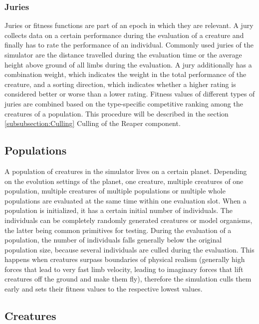 \documentclass[main]{subfiles}
\begin{document}
\subsubsection{Juries}

Juries or fitness functions are part of an epoch in which they are relevant. A jury collects data on a certain performance during the evaluation of a creature and finally has to rate the performance of an individual. Commonly used juries of the simulator are the distance travelled during the evaluation time or the average height above ground of all limbs during the evaluation. A jury additionally has a combination weight, which indicates the weight in the total performance of the creature, and a sorting direction, which indicates whether a higher rating is considered better or worse than a lower rating. Fitness values of different types of juries are combined based on the type-specific competitive ranking among the creatures of a population. This procedure will be described in the section \ref{subsubsection:Culling} Culling of the Reaper component.

\subsection{Populations}

A population of creatures in the simulator lives on a certain planet. Depending on the evolution settings of the planet, one creature, multiple creatures of one population, multiple creatures of multiple populations or multiple whole populations are evaluated at the same time within one evaluation slot. When a population is initialized, it has a certain initial number of individuals. The individuals can be completely randomly generated creatures or model organisms, the latter being common primitives for testing. During the evaluation of a population, the number of individuals falls generally below the original population size, because several individuals are culled during the evaluation. This happens when creatures surpass boundaries of physical realism (generally high forces that lead to very fast limb velocity, leading to imaginary forces that lift creatures off the ground and make them fly), therefore the simulation culls them early and sets their fitness values to the respective lowest values. 

\subsection{Creatures}
\end{document}

